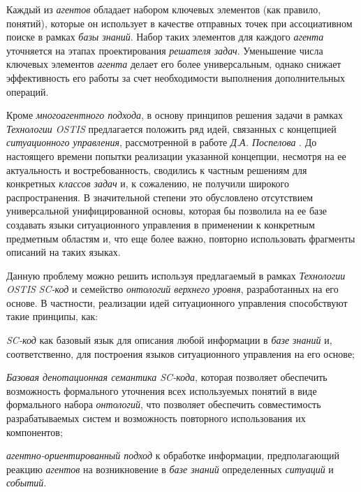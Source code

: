 \begin{textitemize}
Каждый из \textit{агентов} обладает набором ключевых элементов (как правило, понятий), которые он использует в качестве отправных точек при ассоциативном поиске в рамках \textit{базы знаний}. Набор таких элементов для каждого \textit{агента} уточняется на этапах проектирования \textit{решателя задач}. Уменьшение числа ключевых элементов \textit{агента} делает его более универсальным, однако снижает эффективность его работы за счет необходимости выполнения дополнительных операций.
\end{textitemize}

Кроме \textit{многоагентного подхода}, в основу принципов решения задачи в рамках \textit{Технологии OSTIS} предлагается положить ряд идей, связанных с концепцией \textit{ситуационного управления}, рассмотренной в работе \textit{Д.А. Поспелова} . До настоящего времени попытки реализации указанной концепции, несмотря на ее актуальность и востребованность, сводились к частным решениям для конкретных \textit{классов задач} и, к сожалению, не получили широкого распространения. В значительной степени это обусловлено отсутствием универсальной унифицированной основы, которая бы позволила на ее базе создавать языки ситуационного управления в применении к конкретным предметным областям и, что еще более важно, повторно использовать фрагменты описаний на таких языках.

Данную проблему можно решить используя предлагаемый в рамках \textit{Технологии OSTIS} \textit{SC-код} и семейство \textit{онтологий верхнего уровня}, разработанных на его основе. В частности, реализации идей ситуационного управления способствуют такие принципы, как:
\begin{textitemize}
	\item \textit{SC-код} как базовый язык для описания любой информации в \textit{базе знаний} и, соответственно, для построения языков ситуационного управления на его основе;
	\item \textit{Базовая денотационная семантика \textit{SC-кода}}, которая позволяет обеспечить возможность формального уточнения всех используемых понятий в виде формального набора \textit{онтологий}, что позволяет обеспечить совместимость разрабатываемых систем и возможность повторного использования их компонентов;
	\item \textit{агентно-ориентированный подход} к обработке информации, предполагающий реакцию \textit{агентов} на возникновение в \textit{базе знаний} определенных \textit{ситуаций} и \textit{событий}.
\end{textitemize}

